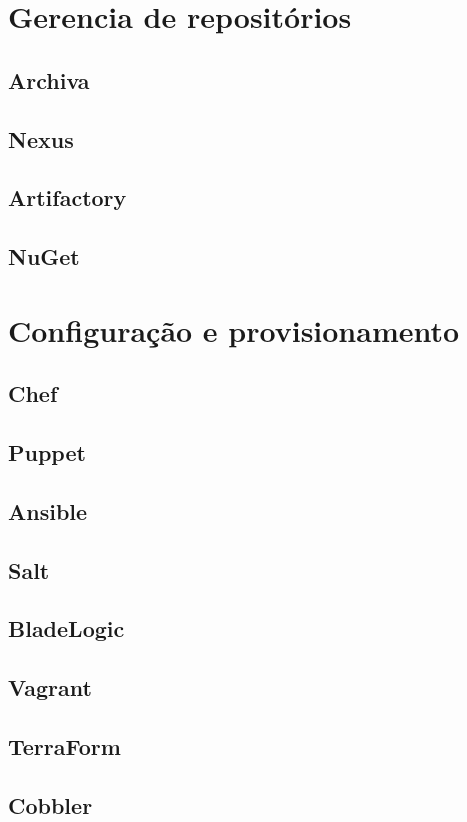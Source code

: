 	
    \section{Gerencia de repositórios}

	\subsection{Archiva}
	\subsection{Nexus}
	\subsection{Artifactory}
	\subsection{NuGet}
	
    \section{Configuração e provisionamento}

	\subsection{Chef}
	\subsection{Puppet}
	\subsection{Ansible}
	\subsection{Salt}
	\subsection{BladeLogic}
	\subsection{Vagrant}
	\subsection{TerraForm}
	\subsection{Cobbler}
